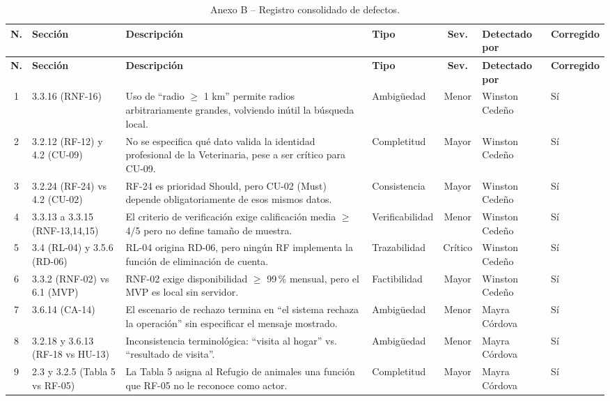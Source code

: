 \documentclass[journal,onecolumn]{IEEEtran}
\begin{document}
	\begin{longtable}{@{}c p{2.3cm} p{5.2cm} p{1.8cm} c p{2cm} p{1.8cm}@{}}
		\caption{Anexo B -- Registro consolidado de defectos.}
		\label{tab:anexo-b} \\
		\toprule
		\textbf{N.\textdegree} & \textbf{Sección} & \textbf{Descripción} & \textbf{Tipo} & \textbf{Sev.} & \textbf{Detectado por} & \textbf{Corregido} \\
		\midrule
		\endfirsthead
		\toprule
		\textbf{N.\textdegree} & \textbf{Sección} & \textbf{Descripción} & \textbf{Tipo} & \textbf{Sev.} & \textbf{Detectado por} & \textbf{Corregido} \\
		\midrule
		\endhead
		1 & 3.3.16 (RNF-16) & Uso de ``radio $\geq$ 1 km'' permite radios arbitrariamente grandes, volviendo inútil la búsqueda local. & Ambigüedad & Menor & Winston Cedeño & Sí \\
		2 & 3.2.12 (RF-12) y 4.2 (CU-09) & No se especifica qué dato valida la identidad profesional de la Veterinaria, pese a ser crítico para CU-09. & Completitud & Mayor & Winston Cedeño & Sí \\
		3 & 3.2.24 (RF-24) vs 4.2 (CU-02) & RF-24 es prioridad Should, pero CU-02 (Must) depende obligatoriamente de esos mismos datos. & Consistencia & Mayor & Winston Cedeño & Sí \\
		4 & 3.3.13 a 3.3.15 (RNF-13,14,15) & El criterio de verificación exige calificación media $\geq$ 4/5 pero no define tamaño de muestra. & Verificabilidad & Menor & Winston Cedeño & Sí \\
		5 & 3.4 (RL-04) y 3.5.6 (RD-06) & RL-04 origina RD-06, pero ningún RF implementa la función de eliminación de cuenta. & Trazabilidad & Crítico & Winston Cedeño & Sí \\
		6 & 3.3.2 (RNF-02) vs 6.1 (MVP) & RNF-02 exige disponibilidad $\geq$ 99\,\% mensual, pero el MVP es local sin servidor. & Factibilidad & Mayor & Winston Cedeño & Sí \\
		7 & 3.6.14 (CA-14) & El escenario de rechazo termina en ``el sistema rechaza la operación'' sin especificar el mensaje mostrado. & Ambigüedad & Menor & Mayra Córdova & Sí \\
		8 & 3.2.18 y 3.6.13 (RF-18 vs HU-13) & Inconsistencia terminológica: ``visita al hogar'' vs. ``resultado de visita''. & Ambigüedad & Menor & Mayra Córdova & Sí \\
		9 & 2.3 y 3.2.5 (Tabla 5 vs RF-05) & La Tabla 5 asigna al Refugio de animales una función que RF-05 no le reconoce como actor. & Completitud & Mayor & Mayra Córdova & Sí \\

\end{longtable}
\end{document}
